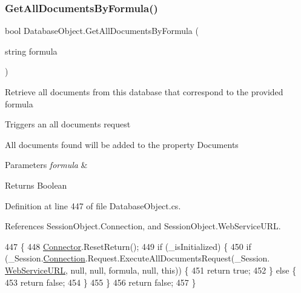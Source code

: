 \subsubsection{\texorpdfstring{Get\+All\+Documents\+By\+Formula()}{GetAllDocumentsByFormula()}}
{\footnotesize\ttfamily bool Database\+Object.\+Get\+All\+Documents\+By\+Formula (\begin{DoxyParamCaption}\item[{string}]{formula }\end{DoxyParamCaption})}



Retrieve all documents from this database that correspond to the provided formula 

Triggers an all documents request

All documents found will be added to the property \textquotesingle{}Documents\textquotesingle{}


\begin{DoxyParams}{Parameters}
{\em formula} & \\
\hline
\end{DoxyParams}
\begin{DoxyReturn}{Returns}
Boolean
\end{DoxyReturn}


Definition at line 447 of file Database\+Object.\+cs.



References Session\+Object.\+Connection, and Session\+Object.\+Web\+Service\+U\+RL.


\begin{DoxyCode}
447                                                          \{
448         \mbox{\hyperlink{class_connector}{Connector}}.ResetReturn();
449         \textcolor{keywordflow}{if} (\_isInitialized) \{
450             \textcolor{keywordflow}{if} (\_Session.\mbox{\hyperlink{class_session_object_a014bdbf705a753540e19bfb53030c55c}{Connection}}.Request.ExecuteAllDocumentsRequest(\_Session.
      \mbox{\hyperlink{class_session_object_a697c071c812fbf7ad1166b896fb44c16}{WebServiceURL}}, null, null, formula, null, \textcolor{keyword}{this})) \{
451                 \textcolor{keywordflow}{return} \textcolor{keyword}{true};
452             \} \textcolor{keywordflow}{else} \{
453                 \textcolor{keywordflow}{return} \textcolor{keyword}{false};
454             \}
455         \}
456         \textcolor{keywordflow}{return} \textcolor{keyword}{false};
457     \}
\end{DoxyCode}
\mbox{\label{class_database_object_ad4834e7677cd0418969a657eed99653c}} 

